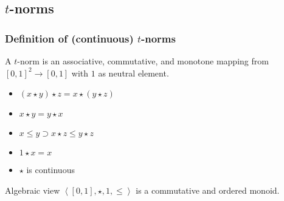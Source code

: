 \documentclass[aspectratio=169]%
  {beamer}
\newcommand{\limp}{\supset}
\begin{document}
\subsection{$t$-norms}
\begin{frame}
  \frametitle{Definition of (continuous) $t$-norms}

  \begin{definition}
    A $t$-norm is an associative, commutative, and monotone mapping
    from $[0,1]^2\to [0,1]$ with $1$ as neutral element.
    \begin{itemize}
    \item $(x \star y) \star z = x \star (y \star z)$
    \item $x \star y = y \star x$
    \item $x\le y \limp x\star z \le y\star z$
    \item $1\star x = x$
    \item $\star$ is continuous
    \end{itemize}
  \end{definition}

  \pause
  \begin{block}{Algebraic view}
    $\left<[0,1], \star, 1, \le\right>$ is a commutative and ordered monoid.
  \end{block}
\end{frame}


 



 
\end{document}
